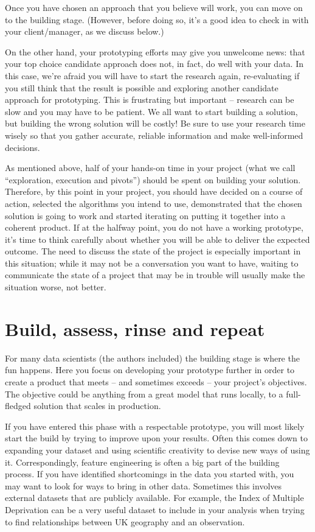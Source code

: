\documentclass[
]{book}
\begin{document}
Once you have chosen an approach that you believe will work, you can move on to the building stage. (However, before doing so, it's a good idea to check in with your client/manager, as we discuss below.)

On the other hand, your prototyping efforts may give you unwelcome news: that your top choice candidate approach does not, in fact, do well with your data. In this case, we're afraid you will have to start the research again, re-evaluating if you still think that the result is possible and exploring another candidate approach for prototyping. This is frustrating but important -- research can be slow and you may have to be patient. We all want to start building a solution, but building the wrong solution will be costly! Be sure to use your research time wisely so that you gather accurate, reliable information and make well-informed decisions.

As mentioned above, half of your hands-on time in your project (what we call ``exploration, execution and pivots'') should be spent on building your solution. Therefore, by this point in your project, you should have decided on a course of action, selected the algorithms you intend to use, demonstrated that the chosen solution is going to work and started iterating on putting it together into a coherent product. If at the halfway point, you do not have a working prototype, it's time to think carefully about whether you will be able to deliver the expected outcome. The need to discuss the state of the project is especially important in this situation; while it may not be a conversation you want to have, waiting to communicate the state of a project that may be in trouble will usually make the situation worse, not better.

\hypertarget{build-assess-rinse-and-repeat}{%
\section{Build, assess, rinse and repeat}\label{build-assess-rinse-and-repeat}}

For many data scientists (the authors included) the building stage is where the fun happens. Here you focus on developing your prototype further in order to create a product that meets -- and sometimes exceeds -- your project's objectives. The objective could be anything from a great model that runs locally, to a full-fledged solution that scales in production.

If you have entered this phase with a respectable prototype, you will most likely start the build by trying to improve upon your results. Often this comes down to expanding your dataset and using scientific creativity to devise new ways of using it. Correspondingly, feature engineering is often a big part of the building process. If you have identified shortcomings in the data you started with, you may want to look for ways to bring in other data. Sometimes this involves external datasets that are publicly available. For example, the Index of Multiple Deprivation can be a very useful dataset to include in your analysis when trying to find relationships between UK geography and an observation.
\end{document}
